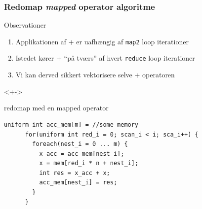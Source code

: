 \documentclass[t]{beamer}
\begin{document}
\begin{frame}[fragile]
  \frametitle{Redomap \textit{mapped} operator algoritme}
  Observationer
  \begin{enumerate}
    \item<+-> Applikationen af $+$ er uafhængig af \texttt{map2} loop iterationer
    \item<+-> Istedet kører $+$ ``på tværs'' af hvert \texttt{reduce} loop iterationer
    \item<+-> Vi kan derved sikkert vektorisere selve $+$ operatoren
  \end{enumerate}
  \begin{onlyenv}<+->
    \begin{block}{redomap med en mapped operator}
\begin{lstlisting}[language=ispc]
      uniform int acc_mem[m] = //some memory
      for(uniform int red_i = 0; scan_i < i; sca_i++) {
        foreach(nest_i = 0 ... m) {
          x_acc = acc_mem[nest_i];
          x = mem[red_i * n + nest_i];
          int res = x_acc + x;
          acc_mem[nest_i] = res;
        }
      }
\end{lstlisting}
    \end{block}
  \end{onlyenv}
  \end{frame}
\end{document}

